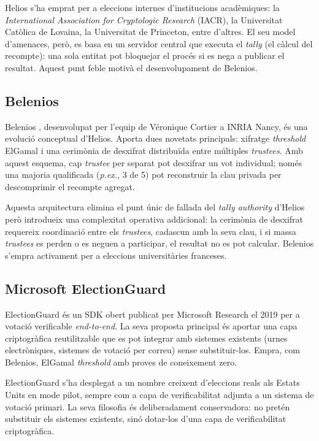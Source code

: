 Helios s'ha emprat per a eleccions internes d'institucions
acadèmiques: la \emph{International Association for Cryptologic
Research} (IACR), la Universitat Catòlica de Lovaina, la Universitat
de Princeton, entre d'altres. El seu model d'amenaces, però, es basa
en un servidor central que executa el \emph{tally} (el càlcul del
recompte): una sola entitat pot bloquejar el procés si es nega a
publicar el resultat. Aquest punt feble motivà el desenvolupament de
Belenios.

\subsection{Belenios}

Belenios \cite{cortier2019belenios}, desenvolupat per l'equip de
Véronique Cortier a INRIA Nancy, és una evolució conceptual d'Helios.
Aporta dues novetats principals: xifratge \emph{threshold} ElGamal i
una cerimònia de desxifrat distribuïda entre múltiples
\emph{trustees}. Amb aquest esquema, cap \emph{trustee} per separat
pot desxifrar un vot individual; només una majoria qualificada
(\emph{p.ex.}, 3 de 5) pot reconstruir la clau privada per
descomprimir el recompte agregat.

Aquesta arquitectura elimina el punt únic de fallada del \emph{tally
authority} d'Helios però introdueix una complexitat operativa
addicional: la cerimònia de desxifrat requereix coordinació entre els
\emph{trustees}, cadascun amb la seva clau, i si massa \emph{trustees}
es perden o es neguen a participar, el resultat no es pot calcular.
Belenios s'empra activament per a eleccions universitàries franceses.

\subsection{Microsoft ElectionGuard}

ElectionGuard \cite{microsoft2019electionguard} és un SDK obert publicat
per Microsoft Research el 2019 per a votació verificable
\emph{end-to-end}. La seva proposta principal és aportar una capa
criptogràfica reutilitzable que es pot integrar amb sistemes
existents (urnes electròniques, sistemes de votació per correu) sense
substituir-los. Empra, com Belenios, ElGamal \emph{threshold} amb
proves de coneixement zero.

ElectionGuard s'ha desplegat a un nombre creixent d'eleccions reals als
Estats Units en mode pilot, sempre com a capa de verificabilitat
adjunta a un sistema de votació primari. La seva filosofia és
deliberadament conservadora: no pretén substituir els sistemes
existents, sinó dotar-los d'una capa de verificabilitat criptogràfica.

